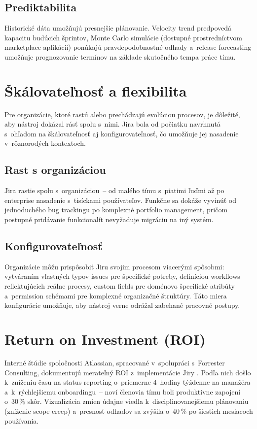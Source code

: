 \subsection{Prediktabilita}

Historické dáta umožňujú presnejšie plánovanie. Velocity trend predpovedá kapacitu budúcich šprintov, Monte Carlo simulácie (dostupné prostredníctvom marketplace aplikácií) ponúkajú pravdepodobnostné odhady a~release forecasting umožňuje prognozovanie termínov na základe skutočného tempa práce tímu.

\section{Škálovateľnosť a flexibilita}

Pre organizácie, ktoré rastú alebo prechádzajú evolúciou procesov, je dôležité, aby nástroj dokázal rásť spolu s~nimi. Jira bola od počiatku navrhnutá s~ohľadom na škálovateľnosť aj konfigurovateľnosť, čo umožňuje jej nasadenie v~rôznorodých kontextoch.

\subsection{Rast s organizáciou}

Jira rastie spolu s~organizáciou~-- od malého tímu s~piatimi ľuďmi až po enterprise nasadenie s~tisíckami používateľov. Funkčne sa dokáže vyvinúť od jednoduchého bug trackingu po komplexné portfolio management, pričom postupné pridávanie funkcionalít nevyžaduje migráciu na iný systém.

\subsection{Konfigurovateľnosť}

Organizácie môžu prispôsobiť Jiru svojim procesom viacerými spôsobmi: vytváraním vlastných typov issues pre špecifické potreby, definíciou workflows reflektujúcich reálne procesy, custom fields pre doménovo špecifické atribúty a~permission schémami pre komplexné organizačné štruktúry. Táto miera konfigurácie umožňuje, aby nástroj verne odrážal zabehané pracovné postupy.

\section{Return on Investment (ROI)}

Interné štúdie spoločnosti Atlassian, spracované v~spolupráci s~Forrester Consulting, dokumentujú merateľný ROI z~implementácie Jiry  \cite{atlassian_roi2023}. Podľa nich došlo k~zníženiu času na status reporting o~priemerne 4~hodiny týždenne na manažéra a~k~rýchlejšiemu onboardingu~-- noví členovia tímu boli produktivne zapojení o~30\,\% skôr. Vizualizácia zmien údajne viedla k~disciplinovanejšiemu plánovaniu (zníženie scope creep) a~presnosť odhadov sa zvýšila o~40\,\% po šiestich mesiacoch používania.

